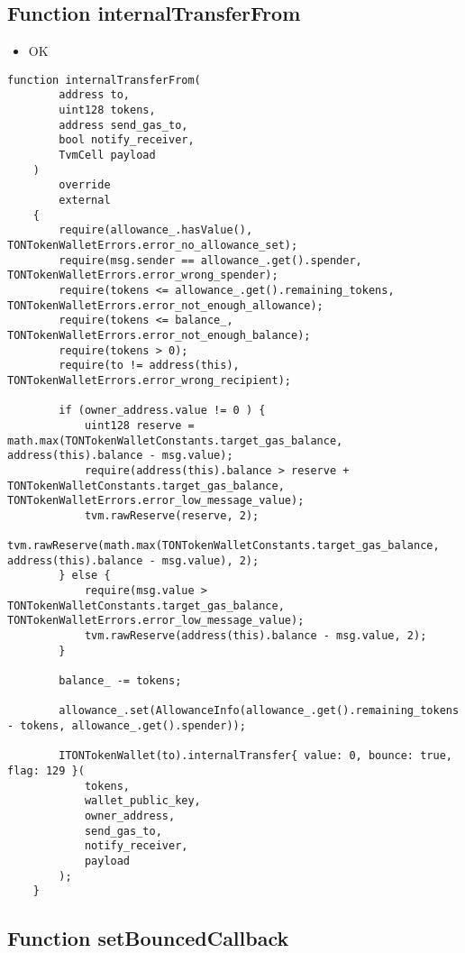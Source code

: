 \subsection{Function internalTransferFrom}

\begin{itemize}
\item OK
\end{itemize}

\begin{lstlisting}[firstnumber=423]
    function internalTransferFrom(
        address to,
        uint128 tokens,
        address send_gas_to,
        bool notify_receiver,
        TvmCell payload
    )
        override
        external
    {
        require(allowance_.hasValue(), TONTokenWalletErrors.error_no_allowance_set);
        require(msg.sender == allowance_.get().spender, TONTokenWalletErrors.error_wrong_spender);
        require(tokens <= allowance_.get().remaining_tokens, TONTokenWalletErrors.error_not_enough_allowance);
        require(tokens <= balance_, TONTokenWalletErrors.error_not_enough_balance);
        require(tokens > 0);
        require(to != address(this), TONTokenWalletErrors.error_wrong_recipient);

        if (owner_address.value != 0 ) {
            uint128 reserve = math.max(TONTokenWalletConstants.target_gas_balance, address(this).balance - msg.value);
            require(address(this).balance > reserve + TONTokenWalletConstants.target_gas_balance, TONTokenWalletErrors.error_low_message_value);
            tvm.rawReserve(reserve, 2);
            tvm.rawReserve(math.max(TONTokenWalletConstants.target_gas_balance, address(this).balance - msg.value), 2);
        } else {
            require(msg.value > TONTokenWalletConstants.target_gas_balance, TONTokenWalletErrors.error_low_message_value);
            tvm.rawReserve(address(this).balance - msg.value, 2);
        }

        balance_ -= tokens;

        allowance_.set(AllowanceInfo(allowance_.get().remaining_tokens - tokens, allowance_.get().spender));

        ITONTokenWallet(to).internalTransfer{ value: 0, bounce: true, flag: 129 }(
            tokens,
            wallet_public_key,
            owner_address,
            send_gas_to,
            notify_receiver,
            payload
        );
    }
\end{lstlisting}

\subsection{Function setBouncedCallback}

